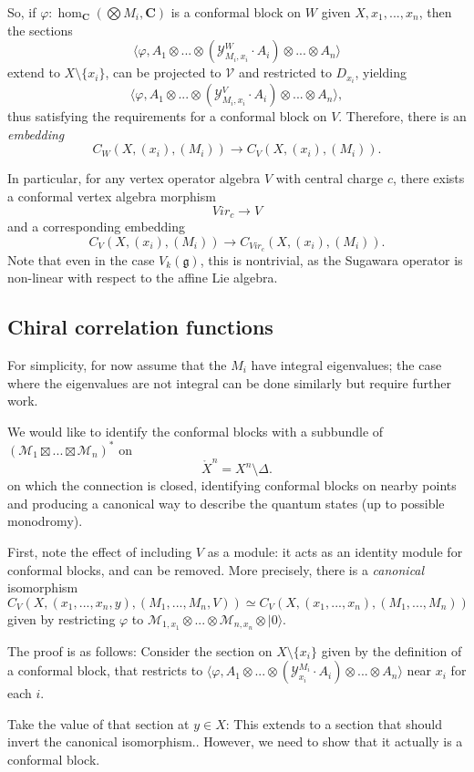 \documentclass{article}
\newcommand{\CC}{\mathbold{C}}
\newcommand{\vac}{|0\rangle}
\newcommand{\Mm}{\mathcal{M}}
\newcommand{\Vv}{\mathcal{V}}
\newcommand{\Yy}{\mathcal{Y}}
\newcommand{\gf}{\mathfrak{g}}
\begin{document}
So, if $\varphi: \hom_\CC(\bigotimes M_i,\CC)$ is a conformal block on $W$ given $X,x_1,...,x_n$, then the sections
\[\langle \varphi,A_1 \otimes ... \otimes(\Yy^W_{M_i,x_i}\cdot A_i) \otimes ... \otimes A_n \rangle \]
extend to $X \setminus \{x_i\}$, can be projected to $\Vv$ and restricted to $D_{x_i}$, yielding
\[\langle \varphi,A_1 \otimes ... \otimes(\Yy^V_{M_i,x_i}\cdot A_i) \otimes ... \otimes A_n \rangle, \]
thus satisfying the requirements for a conformal block on $V$.  Therefore, there is an \textit{embedding}
\[C_W(X,(x_i),(M_i)) \rightarrow C_V(X,(x_i),(M_i)). \]

In particular, for any vertex operator algebra $V$ with central charge $c$, there exists a conformal vertex algebra morphism
\[Vir_c \rightarrow V \]
and a corresponding embedding
\[C_V(X,(x_i),(M_i)) \rightarrow C_{Vir_c}(X,(x_i),(M_i)). \]
Note that even in the case $V_k(\gf)$, this is nontrivial, as the Sugawara operator is non-linear with respect to the affine Lie algebra.
\subsection{Chiral correlation functions}
For simplicity, for now assume that the $M_i$ have integral eigenvalues; the case where the eigenvalues are not integral can be done similarly but require further work.

We would like to identify the conformal blocks with a subbundle of $(\Mm_1 \boxtimes ... \boxtimes \Mm_n)^*$ on
\[\mathring{X}^n=X^n \setminus \Delta. \]
on which the connection is closed, identifying conformal blocks on nearby points and producing a canonical way to describe the quantum states (up to possible monodromy).

First, note the effect of including $V$ as a module: it acts as an identity module for conformal blocks, and can be removed.  More precisely, there is a \textit{canonical} isomorphism
\[C_V(X,(x_1,...,x_n,y),(M_1,...,M_n,V)) \simeq C_V(X,(x_1,...,x_n),(M_1,...,M_n)) \]
given by restricting $\varphi$ to $\Mm_{1,x_1} \otimes ... \otimes \Mm_{n,x_n} \otimes \vac$.

The proof is as follows: Consider the section on $X \setminus \{x_i\}$ given by the definition of a conformal block, that restricts to $\langle \varphi,A_1 \otimes ... \otimes (\Yy^{M_i}_{x_i}\cdot A_i) \otimes ... \otimes A_n \rangle$ near $x_i$ for each $i$.

Take the value of that section at $y \in X$: This extends to a section that should invert the canonical isomorphism..  However, we need to show that it actually is a conformal block.
\end{document}
